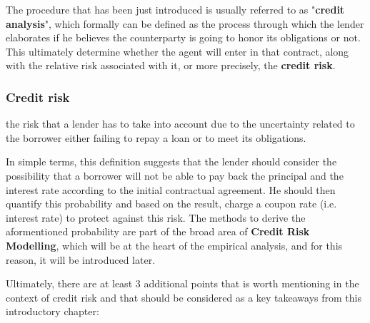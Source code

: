 \documentclass[a4paper,12pt]{article}
\begin{document}
        The procedure that has been just introduced is usually referred to as "\textbf{credit analysis}", which formally can be defined as the process through
        which the lender elaborates if he believes the counterparty is going to honor its obligations or not. This ultimately determine whether
        the agent will enter in that contract, along with the relative risk associated with it, or more precisely, the \textbf{credit risk}.

    \subsubsection{Credit risk}

        \begin{definition}
            the risk that a lender has to take into account due to the uncertainty related to the borrower either failing to repay a loan or to meet its obligations.
        \end{definition}

        In simple terms, this definition suggests that the lender should consider the possibility that a borrower will not be able to pay back the principal and the 
        interest rate according to the initial contractual agreement. He should then quantify this probability and based on the result, charge a coupon rate 
        (i.e. interest rate) to protect against this risk. The methods to derive the aformentioned probability are part of the broad area of \textbf{Credit Risk Modelling},
        which will be at the heart of the empirical analysis, and for this reason, it will be introduced later. 
        
        Ultimately, there are at least 3 additional points that is worth mentioning in the context of credit risk and that should be considered as a key takeaways from this introductory chapter: 
        
\end{document}
